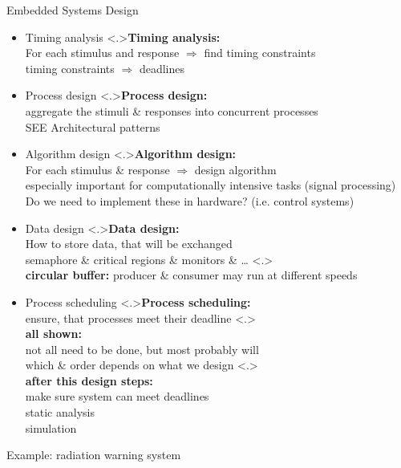 \documentclass[ngerman={babel}, utf8, bigger, t, xcolor={table,dvipsnames}, ompress, hyperref={bookmarks,colorlinks},red]{beamer}
\begin{document}
\begin{frame}{Embedded Systems Design}
\begin{itemize}
\begin{itemize}
\begin{enumerate}
				\end{enumerate}
			\item Timing analysis
			\note<.>{\textbf{Timing analysis:}\\ For each stimulus and response $\Rightarrow$ find timing constraints \\ timing constraints $\Rightarrow$ deadlines}
			\item Process design
			\note<.>{\textbf{Process design:}\\ aggregate the stimuli \& responses into concurrent processes \\
			SEE Architectural patterns}
			\item Algorithm design
			\note<.>{\textbf{Algorithm design:}\\ For each stimulus \& response $\Rightarrow$ design algorithm \\ especially important for computationally intensive tasks (signal processing) \\ Do we need to implement these in hardware? (i.e. control systems)}
			\item Data design
			\note<.>{\textbf{Data design:}\\ How to store data, that will be exchanged \\ semaphore \& critical regions \& monitors \& \dots}
			\note<.>{\\ \vspace*{2em} \textbf{circular buffer:} producer \& consumer may run at different speeds}
			\item Process scheduling
			\note<.>{\textbf{Process scheduling:}\\ ensure, that processes meet their deadline}
			\note<.>{\ \\ \vspace*{2em} \textbf{all shown:}\\ not all need to be done, but most probably will \\ which \& order depends on what we design }
			\note<.>{\\ \vspace*{1em} \textbf{after this design steps:}\\ make sure system can meet deadlines \\ static analysis \\ simulation
			}
		\end{itemize}
	\end{itemize}
\end{frame}

\begin{frame}{Example: radiation warning system}
	
\end{frame}
\end{document}
